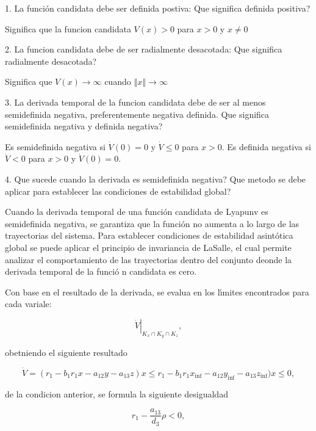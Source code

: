 \documentclass[letterpaper,11pt]{article}
\begin{document}
1. La funci\'{o}n candidata debe ser definida postiva: Que significa
definida positiva?

Significa que la funcion candidata $V(x)>0$ para $x>0$ y $x\neq 0$

2. La funcion candidata debe de ser radialmente desacotada: Que significa
radialmente desacotada?

Significa que $V(x)\longrightarrow \infty $ cuando $\left\Vert x\right\Vert
\longrightarrow \infty $

3. La derivada temporal de la funcion candidata debe de ser al menos
semidefinida negativa, preferentemente negativa definida. Que significa
semidefinida negativa y definida negativa?

Es semidefinida negativa si $\dot{V}(0)=0$ y $\dot{V}\leq 0$ para $x>0$. Es
definida negativa si $\dot{V}<0$ para $x>0$ y $\dot{V}(0)=0$.

4. Que sucede cuando la derivada es semidefinida negativa? Que metodo se
debe aplicar para establecer las condiciones de estabilidad global?

Cuando la derivada temporal de una funci\'{o}n candidata de Lyapunv es
semidefinida negativa, se garantiza que la funci\'{o}n no aumenta a lo largo
de las trayectorias del sistema. Para establecer condiciones de estabilidad
asint\'{o}tica global se puede aplicar el principio de invariancia de
LaSalle, el cual permite \qquad \qquad analizar el comportamiento de las
trayectorias dentro del conjunto deonde la derivada temporal de la funci\'{o}%
n candidata es cero.

Con base en el resultado de la derivada, se evalua en los l\'{\i}mites
encontrados para cada variale:

\begin{equation*}
\left. \dot{V}\right\vert _{K_{x}\cap K_{y}\cap K_{z}},
\end{equation*}

obetniendo el siguiente resultado

\begin{equation*}
\dot{V}=(r_{1}-b_{1}r_{1}x-a_{12}y-a_{13}z)x\leq r_{1}-b_{1}r_{1}x_{\inf
}-a_{12}y_{\inf }-a_{13}z_{\inf })x\leq 0,
\end{equation*}

de la condicion anterior, se formula la siguiente desigualdad

\begin{equation*}
r_{1}-\frac{a_{13}}{d_{3}}\rho <0,
\end{equation*}
\end{document}
